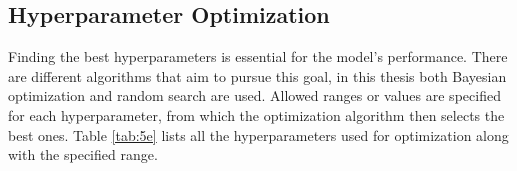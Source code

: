 


\subsection{Hyperparameter Optimization}
\label{sec:funcgat}

Finding the best hyperparameters is essential for the model's performance. There are different algorithms that aim to pursue this goal, in this thesis
both Bayesian optimization and random search are used. Allowed ranges or values are specified for each hyperparameter, from which the optimization algorithm then selects the best ones.
Table \ref{tab:5e} lists all the hyperparameters used for optimization along with the specified range.

